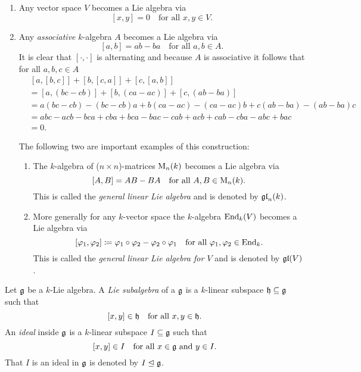 \begin{expls}
 \begin{enumerate}[leftmargin=*]
  \item
   Any vector space $V$ becomes a Lie algebra via
   \[
    [x,y] = 0 \quad \text{for all $x,y \in V$}.
   \]
  \item
   Any \emph{associative} $k$-algebra $A$ becomes a Lie algebra via
   \[
    [a,b] = ab-ba \quad \text{for all $a,b \in A$}.
   \]
   It is clear that $[\cdot, \cdot]$ is alternating and because $A$ is associative it follows that for all $a,b,c \in A$
   \begin{align*}
    &\, [a,[b,c]] + [b,[c,a]] + [c,[a,b]] \\
    &= [a, (bc-cb)] + [b, (ca-ac)] + [c, (ab-ba)] \\
    &= a(bc-cb)-(bc-cb)a + b(ca-ac) - (ca-ac)b + c(ab-ba) - (ab-ba)c \\
    &= abc -acb -bca +cba +bca -bac -cab +acb +cab -cba -abc +bac \\
    &= 0.
   \end{align*}
   
   The following two are important examples of this construction:
   \begin{enumerate}
    \item
     The $k$-algebra of ($n \times n$)-matrices $\operatorname{M}_n(k)$ becomes a Lie algebra via
     \[
      [A,B] = AB-BA \quad \text{for all $A,B \in \operatorname{M}_n(k)$}.
     \]
     This is called the \emph{general linear Lie algebra} and is denoted by $\mathfrak{gl}_n(k)$.
    \item
     More generally for any $k$-vector space the $k$-algebra $\operatorname{End}_k(V)$ becomes a Lie algebra via
     \[
      [\varphi_1, \varphi_2] \coloneqq \varphi_1 \circ \varphi_2 - \varphi_2 \circ \varphi_1
      \quad
      \text{for all $\varphi_1, \varphi_2 \in \operatorname{End}_k$}.
     \]
     This is called the \emph{general linear Lie algebra for $V$} and is denoted by $\mathfrak{gl}(V)$.
   \end{enumerate}
 \end{enumerate}
\end{expls}


\begin{defi}
 Let $\mathfrak{g}$ be a $k$-Lie algebra. A \emph{Lie subalgebra} of a $\mathfrak{g}$ is a $k$-linear subspace $\mathfrak{h} \subseteq \mathfrak{g}$ such that
 \[
  [x,y] \in \mathfrak{h} \quad \text{for all $x,y \in \mathfrak{h}$}.
 \]
 An \emph{ideal} inside $\mathfrak{g}$ is a $k$-linear subspace $I \subseteq \mathfrak{g}$ such that
 \[
  [x,y] \in I \quad \text{for all $x \in \mathfrak{g}$ and $y \in I$}.
 \]
 That $I$ is an ideal in $\mathfrak{g}$ is denoted by $I \trianglelefteq \mathfrak{g}$.
\end{defi}


